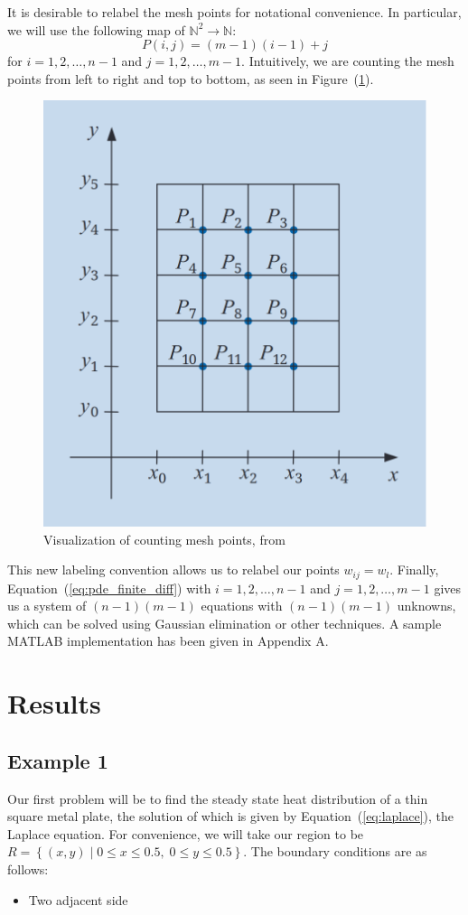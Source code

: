 \documentclass[12pt, titlepage]{article}
\begin{document}
    It is desirable to relabel the mesh points for notational convenience. In particular, we will use the following map of $\mathbb{N}^2 \to \mathbb{N}$:
    \begin{equation}
        P(i,j) = (m-1)(i-1) + j
    \end{equation} 
    for $i=1,2,\dots,n-1$ and $j=1,2,\dots,m-1$. Intuitively, we are counting the mesh points from left to right and top to bottom, as seen in Figure~(\ref{fig:intuitive_grid}).
    \begin{figure}[H]
        \centering
        \includegraphics[width=0.4\linewidth]{intuitive_grid.png}
        \caption{Visualization of counting mesh points, from~\cite{burden_faires_2011}}\label{fig:intuitive_grid}
    \end{figure}
    This new labeling convention allows us to relabel our points $w_{ij} = w_l$. Finally, Equation~(\ref{eq:pde_finite_diff}) with $i=1,2,\dots,n-1$ and $j=1,2,\dots,m-1$
    gives us a system of $(n-1)(m-1)$ equations with $(n-1)(m-1)$ unknowns, which can be solved using Gaussian elimination or other techniques. A sample MATLAB implementation
    has been given in Appendix A.
    \section{Results}
    \subsection{Example 1}
    Our first problem will be to find the steady state heat distribution of a thin square metal plate, the solution of which is given by Equation~(\ref{eq:laplace}), the Laplace equation.
    For convenience, we will take our region to be $R = \left\{(x,y)\; |\; 0 \leq x \leq 0.5,\;0\leq y \leq 0.5\right\}$. The boundary conditions are as follows:
    \begin{itemize}
        \item Two adjacent side
    \end{itemize}
    \newpage
\end{document}
